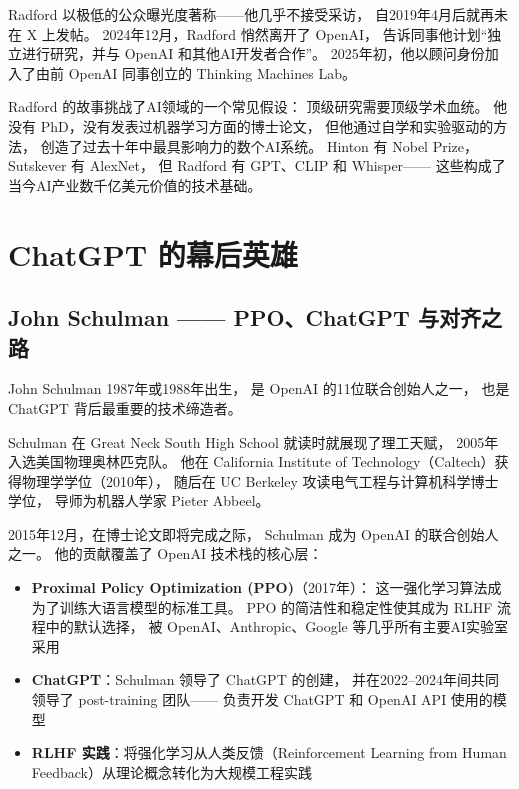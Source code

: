 Radford 以极低的公众曝光度著称——他几乎不接受采访，
自2019年4月后就再未在 X 上发帖。
2024年12月，Radford 悄然离开了 OpenAI，
告诉同事他计划``独立进行研究，并与 OpenAI 和其他AI开发者合作''。
2025年初，他以顾问身份加入了由前 OpenAI 同事创立的 Thinking Machines Lab。

\begin{keybox}[一个没有博士学位的革命者]
Radford 的故事挑战了AI领域的一个常见假设：
顶级研究需要顶级学术血统。
他没有 PhD，没有发表过机器学习方面的博士论文，
但他通过自学和实验驱动的方法，
创造了过去十年中最具影响力的数个AI系统。
Hinton 有 Nobel Prize，Sutskever 有 AlexNet，
但 Radford 有 GPT、CLIP 和 Whisper——
这些构成了当今AI产业数千亿美元价值的技术基础。
\end{keybox}


\section{ChatGPT 的幕后英雄}
\label{sec:openai-key-researchers}

\subsection{John Schulman —— PPO、ChatGPT 与对齐之路}
\label{subsec:john-schulman}

John Schulman 1987年或1988年出生，
是 OpenAI 的11位联合创始人之一，
也是 ChatGPT 背后最重要的技术缔造者。

Schulman 在 Great Neck South High School 就读时就展现了理工天赋，
2005年入选美国物理奥林匹克队。
他在 California Institute of Technology（Caltech）获得物理学学位（2010年），
随后在 UC Berkeley 攻读电气工程与计算机科学博士学位，
导师为机器人学家 Pieter Abbeel。

2015年12月，在博士论文即将完成之际，
Schulman 成为 OpenAI 的联合创始人之一。
他的贡献覆盖了 OpenAI 技术栈的核心层：

\begin{itemize}[noitemsep]
  \item \textbf{Proximal Policy Optimization (PPO)}（2017年）：
        这一强化学习算法成为了训练大语言模型的标准工具。
        PPO 的简洁性和稳定性使其成为 RLHF 流程中的默认选择，
        被 OpenAI、Anthropic、Google 等几乎所有主要AI实验室采用
  \item \textbf{ChatGPT}：Schulman 领导了 ChatGPT 的创建，
        并在2022--2024年间共同领导了 post-training 团队——
        负责开发 ChatGPT 和 OpenAI API 使用的模型
  \item \textbf{RLHF 实践}：将强化学习从人类反馈（Reinforcement Learning from
        Human Feedback）从理论概念转化为大规模工程实践
\end{itemize}

